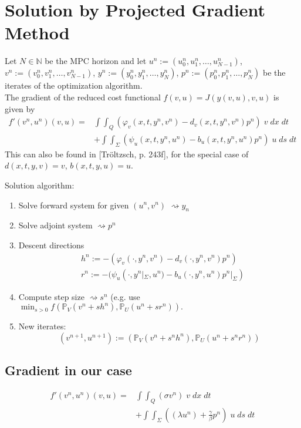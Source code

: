 \documentclass[
12pt, %
a4paper, %
onecolumn, %
portrait %
]{article}
\begin{document}
\section{Solution by Projected Gradient Method}
Let $N \in \mathbb{N}$ be the MPC horizon and let $u^n := (u_0^n, u_1^n, \hdots, u_{N-1}^n)$, $v^n := (v_0^n, v_1^n, \hdots, v_{N-1}^n)$, $y^n := (y_0^n, y_1^n, \hdots, y_{N}^n)$, $p^n := (p_0^n, p_1^n, \hdots, p_{N}^n)$ be the iterates of the optimization algorithm. \\ 
The gradient of the reduced cost functional $f(v,u) = J(y(v,u), v, u)$ is given by
\begin{align*}
f'(v^n, u^n)(v,u) = & \int \int_Q (\varphi_v(x,t, y^n, v^n) - d_v(x,t,y^n,v^n) p^n) \; v \; dx \; dt \\
& + \int \int_{\Sigma} (\psi_u(x,t,y^n, u^n) - b_u(x,t,y^n,u^n) p^n) \; u \; ds \; dt
\end{align*}
This can also be found in [Tr\"oltzsch, p. 243f], for the special case of $d(x,t,y,v) = v$, $b(x,t,y,u) = u$.

Solution algorithm:\\
\begin{enumerate}
\item Solve forward system for given $(u^n, v^n)$ $\rightsquigarrow y_n$ \\
\item Solve adjoint system $\rightsquigarrow p^n$ \\
\item Descent directions
\begin{align*}
&h^n := -(\varphi_v(\cdot, y^n, v^n) - d_v(\cdot,y^n,v^n) p^n) \\ 
&r^n := -(\psi_u(\cdot, y^n |_{\Sigma}, u^n) - b_u(\cdot,y^n,u^n) p^n |_{\Sigma})
\end{align*}
\item Compute step size $\rightsquigarrow s^n$
(e.g. use $\min_{s > 0} f(\mathbb{P}_V(v^n+s h^n), \mathbb{P}_U(u^n + s r^n)).$
\item New iterates:
\begin{equation}
(v^{n+1}, u^{n+1}) := (\mathbb{P}_V(v^n + s^n h^n), \mathbb{P}_U(u^n + s^n r^n))
\end{equation}
\end{enumerate}

\subsection{Gradient in our case}
\begin{align*}
f'(v^n, u^n)(v,u) = & \int \int_Q (\sigma v^n) \; v \; dx \; dt \\
& + \int \int_{\Sigma} ((\lambda u^n) + \frac{\gamma}{\beta} p^n) \; u \; ds \; dt
\end{align*}
\end{document}
